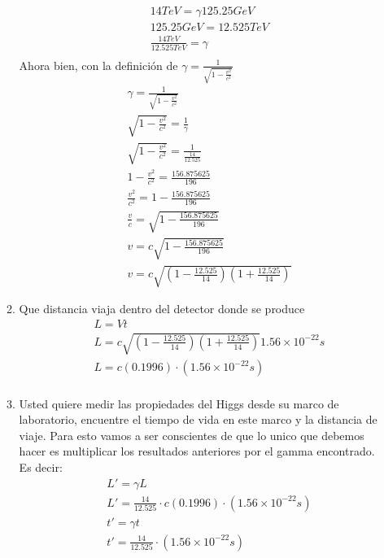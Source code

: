 \documentclass[12pt]{exam}
\begin{document}
\begin{enumerate}
\begin{enumerate}
\begin{align*}
					& 14 TeV = \gamma 125.25 GeV\\
					& 125.25 GeV = 12.525 TeV\\
					& \frac{14 TeV}{12.525 TeV} = \gamma\\
				\end{align*}
				Ahora bien, con la definición de $\gamma = \frac{1}{\sqrt{1-\frac{v^2}{c^2}}}$
				\begin{align*}
					& \gamma = \frac{1}{\sqrt{1-\frac{v^2}{c^2}}}\\
					& \sqrt{1-\frac{v^2}{c^2}} = \frac{1}{\gamma}\\
					& \sqrt{1-\frac{v^2}{c^2}} = \frac{1}{\frac{14}{12.525}}\\
					& 1 - \frac{v^2}{c^2} = \frac{156.875625}{196}\\
					& \frac{v^2}{c^2} = 1 - \frac{156.875625}{196}\\
					& \frac{v}{c} = \sqrt{1 - \frac{156.875625}{196}}\\
					& v = c\sqrt{1 - \frac{156.875625}{196}}\\
					& v = c\sqrt{\left(1-\frac{12.525}{14}\right)\left(1+\frac{12.525}{14}\right)}
				\end{align*}
			\item Que distancia viaja dentro del detector donde se produce
				\begin{align*}
					& L = V t\\
					& L = c\sqrt{\left(1-\frac{12.525}{14}\right)\left(1+\frac{12.525}{14}\right)}1.56\times10^{-22}s\\
					& L = c(0.1996)\cdot(1.56\times10^{-22}s)\\
				\end{align*}
			\item Usted quiere medir las propiedades del Higgs desde su marco de laboratorio, encuentre el tiempo de vida en este marco y la distancia de viaje.
				Para esto vamos a ser conscientes de que lo unico que debemos hacer es multiplicar los resultados anteriores por el gamma encontrado. Es decir:
				\begin{align*}
					& L' = \gamma L\\
					& L' = \frac{14}{12.525}\cdot c(0.1996)\cdot(1.56\times10^{-22}s)\\
					& t' = \gamma t\\
					& t' = \frac{14}{12.525}\cdot (1.56\times10^{-22}s)
				\end{align*}
		\end{enumerate}
\end{enumerate}
\end{document}
